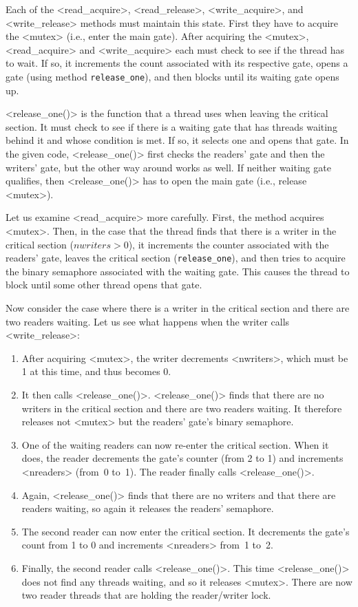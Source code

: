 \documentclass{report}
\begin{document}
Each of the
<{read_acquire}>, <{read_release}>,
<{write_acquire}>, and <{write_release}> methods must maintain
this state.
First they have to acquire the <{mutex}>
(i.e., enter the main gate).
After acquiring the <{mutex}>,
<{read_acquire}> and <{write_acquire}> each must check to see
if the thread has to wait.
If so, it increments the count associated with its respective gate,
opens a gate (using method \texttt{release\_one}), and then blocks until
its waiting gate opens up.

<{release_one()}> is the function that a thread uses when leaving
the critical section.  It must check to see if there is a waiting gate
that has threads waiting behind it and whose condition is met.
If so, it selects one and opens that gate.  In the given code,
<{release_one()}> first checks the readers' gate and then the
writers' gate, but the other way around works as well.
If neither waiting gate qualifies, then <{release_one()}> 
has to open the main gate (i.e., release <{mutex}>).

Let us examine <{read_acquire}> more carefully.
First, the method acquires <{mutex}>.
Then, in the case that the thread
finds that there is a writer in the critical section
($\mathit{nwriters > 0}$), it increments the counter associated with
the readers' gate, leaves the critical section (\texttt{release\_one}), and
then tries to acquire the binary semaphore associated with the waiting gate.
This causes the thread to block until some other thread opens that gate.

Now consider the case where there is a writer in the critical
section and there are two readers waiting.  Let us see what happens when
the writer calls <{write_release}>:
\begin{enumerate}
\item After acquiring <{mutex}>, the writer decrements
<{nwriters}>, which must be 1 at this time, and thus becomes 0.
\item It then calls <{release_one()}>.
<{release_one()}> finds that there are no writers in the critical section
and there are two readers waiting.  It therefore releases not
<{mutex}> but the readers' gate's binary semaphore.
\item One of the waiting readers can now re-enter the critical section.
When it does, the reader decrements the gate's counter (from 2 to 1)
and increments <{nreaders}> (from~0 to~1).
The reader finally calls <{release_one()}>.
\item Again, <{release_one()}> finds that there are no writers and
that there are readers waiting, so again it releases the readers' semaphore.
\item The second reader can now enter the critical section.
It decrements the gate's count from 1 to 0 and increments <{nreaders}>
from~1 to~2.
\item Finally, the second reader  calls <{release_one()}>.
This time <{release_one()}> does not find any threads waiting,
and so it releases <{mutex}>.
There are now two reader threads that are holding the reader/writer lock.
\end{enumerate}
\end{document}
